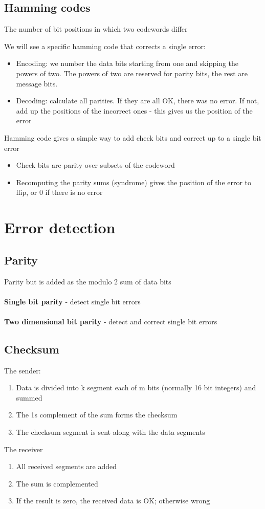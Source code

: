 \documentclass{article}[18pt]
\begin{document}
\subsection{Hamming codes}
\begin{defin}
The number of bit positions in which two codewords differ
\end{defin}
We will see a specific hamming code that corrects a single error:
\begin{itemize}
	\item Encoding: we number the data bits starting from one and skipping the powers of two. The powers of two are reserved for parity bits, the rest are message bits.
	\item Decoding: calculate all parities. If they are all OK, there was no error. If not, add up the positions of the incorrect ones - this gives us the position of the error
\end{itemize}
Hamming code gives a simple way to add check bits and correct up to a single bit error
\begin{itemize}
	\item Check bits are parity over subsets of the codeword
	\item Recomputing the parity sums (syndrome) gives the position of the error to flip, or 0 if there is no error
\end{itemize}
\section{Error detection}
\subsection{Parity}
Parity but is added as the modulo 2 sum of data bits\\
\\
\textbf{Single bit parity} - detect single bit errors\\
\\
\textbf{Two dimensional bit parity} - detect and correct single bit errors
\subsection{Checksum}
The sender:
\begin{enumerate}
	\item Data is divided into k segment each of m bits (normally 16 bit integers) and summed
	\item The 1s complement of the sum forms the checksum
	\item The checksum segment is sent along with the data segments
\end{enumerate}
The receiver
\begin{enumerate}
	\item All received segments are added
	\item The sum is complemented
	\item If the result is zero, the received data is OK; otherwise wrong
\end{enumerate}
\end{document}
